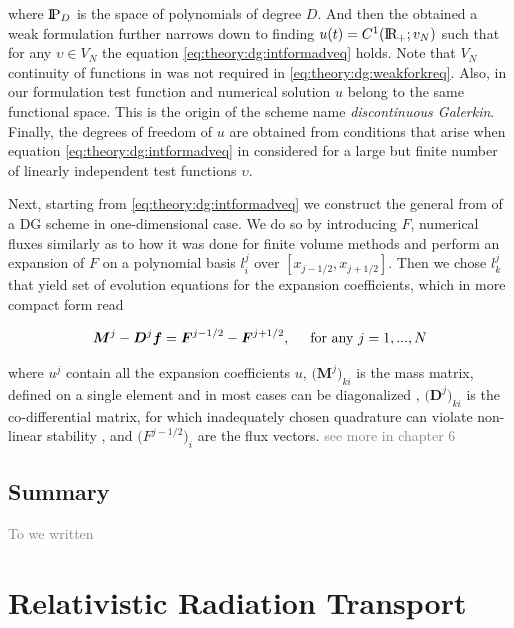 \documentclass[11pt,a4paper,headinclude=true,DIV=14,BCOR=8mm,chapterprefix,listof=totoc,twoside,openright,abstracton]{scrbook}
\newcommand{\gray}[1]{\textcolor{gray}{#1}}
\begin{document}
where $\text{I\!P}_{D}$ is the space of polynomials of degree $D$. And then the obtained a weak formulation further narrows down to finding $u(t) = C^1(\text{I\!R}_{+};v_N)$ such that for any $ \upsilon\in V_N $ the equation \ref{eq:theory:dg:intformadveq} holds. Note that $V_N$ continuity of functions in was not required in \ref{eq:theory:dg:weakforkreq}. Also, in our formulation test function and numerical solution $u$ belong to the same functional space. This is the origin of the scheme name \textit{discontinuous Galerkin}. Finally, the degrees of freedom of $u$ are obtained from conditions that arise when equation \ref{eq:theory:dg:intformadveq} in considered for a large but finite number of linearly independent test functions $\upsilon$. 

Next, starting from \ref{eq:theory:dg:intformadveq} we construct the general from of a DG scheme in one-dimensional case. We do so by introducing $F$, numerical fluxes similarly as to how it was done for finite volume methods and perform an expansion of $F$ on a polynomial basis $l_{i}^{j}$ over $[x_{j-1/2}, x_{j+1/2}]$. Then we chose $l_{k}^{j}$ that yield set of evolution equations for the expansion coefficients, which in more compact form read

\begin{equation}
\boldsymbol{M}^{j} - \boldsymbol{D}^{j}\boldsymbol{f} = \boldsymbol{F}^{j-1/2} - \boldsymbol{F}^{j+1/2}, \hspace{5mm} \text{for any } j=1,...,N \\
\end{equation}

where $u^{j}$ contain all the expansion coefficients $u$,  $\big(\boldsymbol{M}^j\big)_{ki}$ is the mass matrix, defined on a single element and in most cases can be diagonalized \cite{Canuto:2008}, $\big(\boldsymbol{D}^{j}\big)_{ki}$ is the co-differential matrix, for which inadequately chosen quadrature can violate non-linear stability \cite{Hesthaven:2007}, and $\big(F^{j-1/2}\big)_i$ are the flux vectors. \textcolor{gray}{see more in chapter 6}


\subsection{Summary}

\gray{To we written}


\section{Relativistic Radiation Transport}
\end{document}
